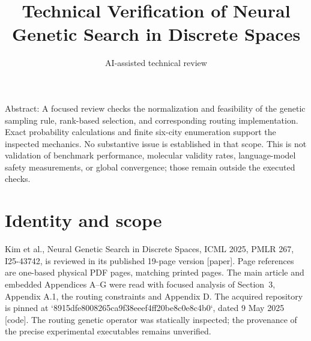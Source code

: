 \documentclass[10pt]{article}
\title{Technical Verification of
Neural Genetic Search in Discrete Spaces}
\author{AI-assisted technical review}
\date{}
\begin{document}
\maketitle
Abstract: A focused review checks the normalization and feasibility of the genetic sampling rule, rank-based selection, and corresponding routing implementation. Exact probability calculations and finite six-city enumeration support the inspected mechanics. No substantive issue is established in that scope. This is not validation of benchmark performance, molecular validity rates, language-model safety measurements, or global convergence; those remain outside the executed checks.\par
\section*{Identity and scope}
Kim et al., Neural Genetic Search in Discrete Spaces, ICML 2025, PMLR 267, I25-43742, is reviewed in its published 19-page version [paper]. Page references are one-based physical PDF pages, matching printed pages. The main article and embedded Appendices A–G were read with focused analysis of Section 3, Appendix A.1, the routing constraints and Appendix D. The acquired repository is pinned at `8915dfe8008265ca9f38eeef4ff20be8c0e8c4b0`, dated 9 May 2025 [code]. The routing genetic operator was statically inspected; the provenance of the precise experimental executables remains unverified.\par
\end{document}
